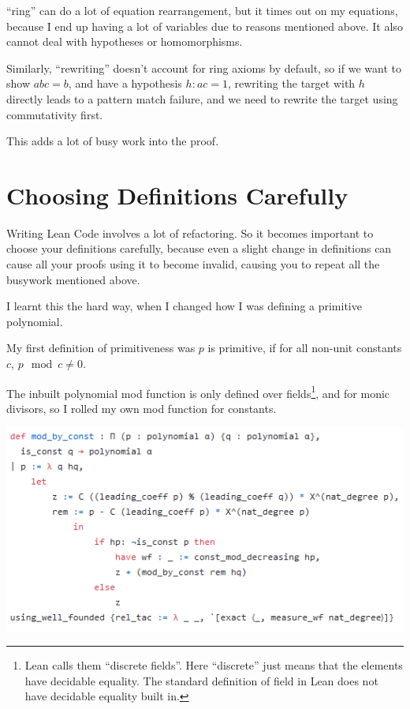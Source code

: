 \documentclass[pagesize=a4]{scrreprt}
\begin{document}
``ring'' can do a lot of equation rearrangement, but it times out on my equations, because I end up having a lot of variables due to reasons mentioned above. It also cannot deal with hypotheses or homomorphisms. 

Similarly, ``rewriting'' doesn't account for ring axioms by default, so if we want to show $a b c = b$, and have a hypothesis $h : a c = 1$, rewriting the target with $h$ directly leads to a pattern match failure, and we need to rewrite the target using commutativity first.

This adds a lot of busy work into the proof. 

\section{Choosing Definitions Carefully}

Writing Lean Code involves a lot of refactoring. So it becomes important to choose your definitions carefully, because even a slight change in definitions can cause all your proofs using it to become invalid, causing you to repeat all the busywork mentioned above. 

I learnt this the hard way, when I changed how I was defining a primitive polynomial. 

My first definition of primitiveness was $p$ is primitive, if for all non-unit constants $c$, $p \mod c \neq 0$. 

The inbuilt polynomial mod function is only defined over fields\footnote{Lean calls them ``discrete fields''. Here ``discrete'' just means that the elements have decidable equality. The standard definition of field in Lean does not have decidable equality built in.}, and for monic divisors, so I rolled my own mod function for constants. 

\includegraphics{const_mod.png}
\end{document}
